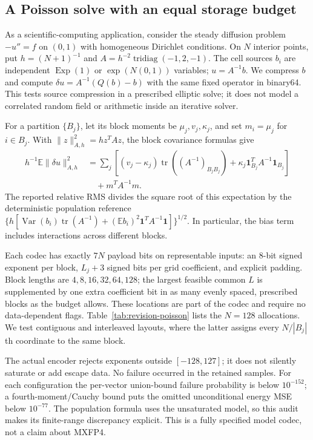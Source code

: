 \subsection{A Poisson solve with an equal storage budget}
\label{sec:revision-poisson}
As a scientific-computing application, consider the steady diffusion problem
$-u''=f$ on $(0,1)$ with homogeneous Dirichlet conditions. On $N$ interior
points, put $h=(N+1)^{-1}$ and $A=h^{-2}\operatorname{tridiag}(-1,2,-1)$.
The cell sources $b_i$ are independent $\operatorname{Exp}(1)$ or
$\exp(N(0,1))$ variables; $u=A^{-1}b$. We compress $b$ and compute
$\delta u=A^{-1}(Q(b)-b)$ with the same fixed operator in binary64.
This tests source compression in a prescribed elliptic solve; it does not
model a correlated random field or arithmetic inside an iterative solver.

For a partition $\{B_j\}$, let its block moments be $\mu_j,v_j,\kappa_j$,
and set $m_i=\mu_j$ for $i\in B_j$. With $\|z\|_{A,h}^2=h z^TAz$,
the block covariance formulas give
\begin{equation}\label{eq:revision-poisson-energy}
\begin{aligned}
 h^{-1}\mathbb E\|\delta u\|_{A,h}^2
 &=\sum_j\left[(v_j-\kappa_j)
    \operatorname{tr}((A^{-1})_{B_jB_j})
 +\kappa_j\mathbf1_{B_j}^{T}A^{-1}\mathbf1_{B_j}\right]\\
 &\quad +m^TA^{-1}m.
\end{aligned}
\end{equation}
The reported relative RMS divides the square root of this expectation by
the deterministic population reference
$\{h[\operatorname{Var}(b_i)\operatorname{tr}(A^{-1})+
(\mathbb E b_i)^2\mathbf1^TA^{-1}\mathbf1]\}^{1/2}$.
In particular, the bias term includes interactions across different blocks.

Each codec has exactly $7N$ payload bits on representable inputs: an 8-bit
signed exponent per block, $L_j+3$ signed bits per grid coefficient, and
explicit padding. Block lengths are $4,8,16,32,64,128$; the largest feasible
common $L$ is supplemented by one extra coefficient bit in as many evenly
spaced, prescribed blocks as the budget allows. These locations are part of
the codec and require no data-dependent flags. Table~\ref{tab:revision-poisson}
lists the $N=128$ allocations. We test contiguous and interleaved layouts,
where the latter assigns every $N/|B_j|$th coordinate to the same block.

The actual encoder rejects exponents outside $[-128,127]$; it does not
silently saturate or add escape data. No failure occurred in the retained
samples. For each configuration the per-vector union-bound failure probability is
below $10^{-152}$; a fourth-moment/Cauchy bound puts the omitted
unconditional energy MSE below $10^{-77}$. The population formula
uses the unsaturated model, so this audit makes its finite-range discrepancy
explicit. This is a fully specified model codec, not a claim about MXFP4.

